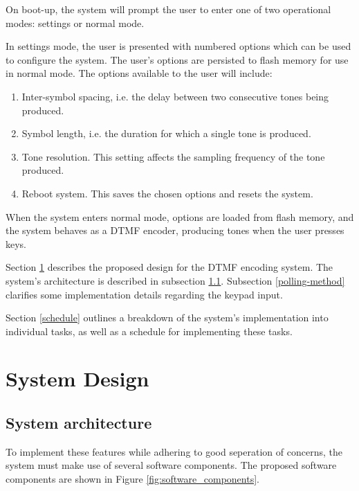 \documentclass[11pt,a4paper,twocolumn]{scrartcl}
\begin{document}
   On boot-up, the system will prompt the user to enter one of two operational modes: settings or normal mode.

   In settings mode, the user is presented with numbered options which can be used to configure the system. 
   The user's options are persisted to flash memory for use in normal mode.
   The options available to the user will include:

   \begin{enumerate}
      \item Inter-symbol spacing, i.e. the delay between two consecutive tones being produced.
      \item Symbol length, i.e. the duration for which a single tone is produced.
      \item Tone resolution. This setting affects the sampling frequency of the tone produced.
      \item Reboot system. This saves the chosen options and resets the system.
   \end{enumerate}

   When the system enters normal mode, options are loaded from flash memory, and the system behaves as a DTMF encoder, 
   producing tones when the user presses keys.

   Section \ref{system-design} describes the proposed design for the DTMF encoding system. The system's architecture is described in subsection \ref{system-arch}. 
   Subsection \ref{polling-method} clarifies some implementation details regarding the keypad input.

   Section \ref{schedule} outlines a breakdown of the system's implementation into individual tasks, as well as a schedule for implementing these tasks.

\section{System Design} \label{system-design}

\subsection{System architecture} \label{system-arch}

To implement these features while adhering to good seperation of concerns, the system must make use of several software components.
The proposed software components are shown in Figure \ref{fig:software_components}.
\end{document}
